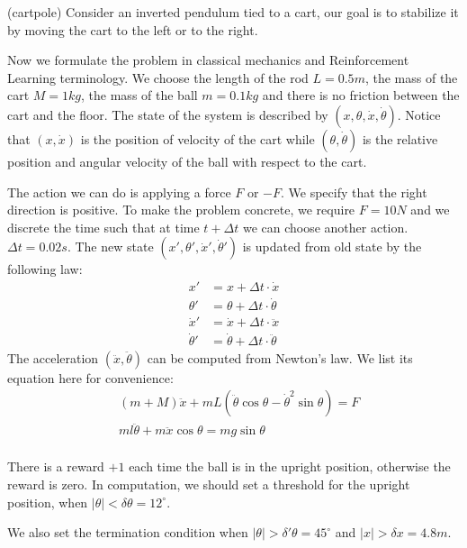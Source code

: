 \documentclass{article}
\begin{document}
(cartpole) Consider an inverted pendulum tied to a cart, our goal is to stabilize it by moving the cart
to the left or to the right.

Now we formulate the problem in classical mechanics and Reinforcement Learning terminology.
We choose the length of the rod $L = 0.5 m$, the mass of the cart $M=1 kg$, the mass of the ball $m=0.1 kg$
and there is no friction between the cart and the floor.
The state of the system is described by
$(x, \theta, \dot{x}, \dot{\theta})$. Notice that $(x, \dot{x})$ is the position of velocity of the cart while
$(\theta, \dot{\theta})$ is the relative position and angular velocity of the ball with respect to the cart.

The action we can do is applying a force
$F$ or $-F$. We specify that the right direction is positive. To make the problem concrete,
we require $F=10N$ and we discrete the time such that at time $t+\Delta t$ we can choose another action.
$\Delta t = 0.02s$. The new state $(x', \theta', \dot{x}', \dot{\theta}')$ is updated from old state by the following law:
\begin{align*}
x' &= x + \Delta t \cdot \dot{x} \\
\theta' &= \theta + \Delta t \cdot \dot{\theta} \\
\dot{x}' &= \dot{x} + \Delta t \cdot \ddot{x} \\
\dot{\theta}' &= \dot{\theta} + \Delta t \cdot \ddot{\theta}
\end{align*}
The acceleration $(\ddot{x}, \ddot{\theta})$ can be computed from Newton's law.
We list its equation here for convenience:
\begin{align*}
& (m + M)\ddot{x} + mL(\ddot{\theta} \cos \theta - \dot{\theta}^2 \sin \theta) = F \\
& m l \ddot{\theta} + m \ddot{x} \cos\theta = m g \sin \theta \\
\end{align*}

There is a reward $+1$ each time the ball is in the upright position, otherwise the reward is zero.
In computation, we should set a threshold for the upright position, when $|\theta|< \delta \theta = 12^\circ$.

We also set the termination condition when $|\theta| > \delta' \theta = 45^\circ$ and $|x| > \delta x = 4.8 m $.
\end{document}
